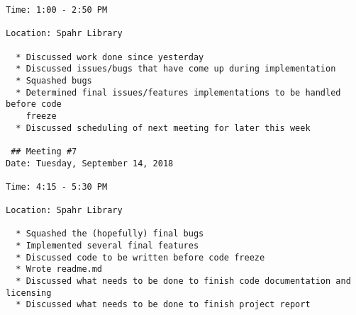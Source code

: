 \documentclass[12pt]{report}
\begin{document}
\begin{lstlisting}
Time: 1:00 - 2:50 PM

Location: Spahr Library

  * Discussed work done since yesterday
  * Discussed issues/bugs that have come up during implementation
  * Squashed bugs
  * Determined final issues/features implementations to be handled before code
    freeze
  * Discussed scheduling of next meeting for later this week
  
 ## Meeting #7
Date: Tuesday, September 14, 2018

Time: 4:15 - 5:30 PM

Location: Spahr Library

  * Squashed the (hopefully) final bugs
  * Implemented several final features
  * Discussed code to be written before code freeze
  * Wrote readme.md
  * Discussed what needs to be done to finish code documentation and licensing
  * Discussed what needs to be done to finish project report

\end{lstlisting}
\end{document}
